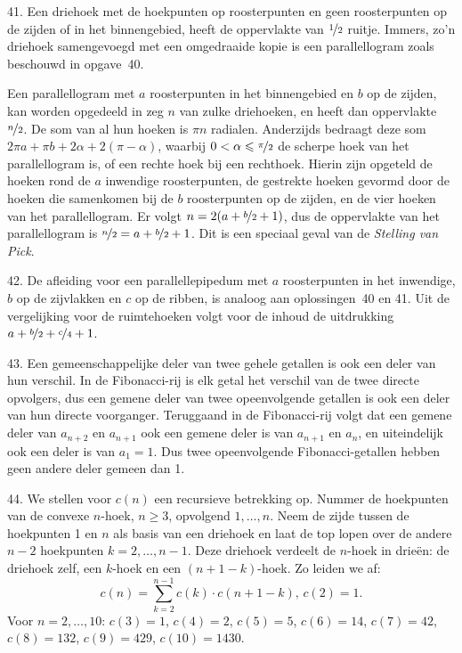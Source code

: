 \begin{problem}{41.}
    Een driehoek met de hoekpunten op roosterpunten en geen roos\-terpunten op de zijden of in het binnengebied, heeft de oppervlakte van $\nicefrac{1}{2}$ ruitje. Immers, zo'n driehoek samengevoegd met een omge\-draaide kopie is een parallellogram zoals beschouwd in opgave~40.

    Een parallellogram met $a$ roosterpunten in het binnengebied en $b$ op de zijden, kan worden opgedeeld in zeg $n$ van zulke driehoeken, en heeft dan oppervlakte $\nicefrac{n}{2}$. De som van al hun hoeken is $\pi n$ radialen. Anderzijds bedraagt deze som $2 \pi a + \pi b + 2 \alpha + 2 (\pi - \alpha)$, waarbij $0 < \alpha \leq \nicefrac{\pi}{2}$ de scherpe hoek van het parallellogram is, of een rechte hoek bij een rechthoek. Hierin zijn opgeteld de hoeken rond de $a$ inwendige roosterpunten, de gestrekte hoeken gevormd door de hoeken die samenkomen bij de $b$ roosterpunten op de zijden, en de vier hoeken van het parallellogram. Er volgt $n = 2 (a + \nicefrac{b}{2} + 1)$, dus de oppervlakte van het parallellogram is $\nicefrac{n}{2} = a + \nicefrac{b}{2} + 1$. Dit is een speciaal geval van de \textit{Stelling van Pick}.
\end{problem}

\begin{problem}{42.}
	De afleiding voor een parallellepipedum met $a$ roosterpunten in het inwendige, $b$ op de zijvlakken en $c$ op de ribben, is analoog aan oplossingen~40 en 41. Uit de vergelijking voor de ruimtehoeken volgt voor de inhoud de uitdrukking $a + \nicefrac{b}{2} + \nicefrac{c}{4} + 1$.
\end{problem}

\clearpage

\begin{problem}{43.}
    Een gemeenschappelijke deler van twee gehele getallen is ook een deler van hun verschil. In de Fibonacci-rij is elk getal het verschil van de twee directe opvolgers, dus een gemene deler van twee opeenvolgen\-de getallen is ook een deler van hun directe voorganger. Teruggaand in de Fibonacci-rij volgt dat een gemene deler van $a_{n+2}$ en $a_{n+1}$ ook een gemene deler is van $a_{n+1}$ en $a_{n}$, en uiteindelijk ook een deler is van $a_1 = 1$. Dus twee opeenvolgende Fibonacci-getallen hebben geen andere deler gemeen dan 1.
\end{problem}

\begin{problem}{44.}
	We stellen voor $c(n)$ een recursieve betrekking op. Nummer de hoekpunten van de convexe $n$-hoek, $n \geq 3$, opvolgend $1,\dotsc,n$. Neem de zijde tussen de hoekpunten 1 en $n$ als basis van een driehoek en laat de top lopen over de andere $n - 2$ hoekpunten $k = 2,\dotsc,n-1$. Deze driehoek verdeelt de $n$-hoek in drieën: de driehoek zelf, een $k$-hoek en een $(n + 1 - k)$-hoek. Zo leiden we af:
    \begin{equation*}
        c(n) = \textstyle\sum\limits_{k=2}^{n-1} c(k) \cdot c(n + 1 - k),\, c(2) = 1.
    \end{equation*}
    Voor $n = 2,\dotsc,10$: $c(3) = 1$, $c(4) = 2$, $c(5) = 5$, $c(6) = 14$, $c(7) = 42$, $c(8) = 132$, $c(9) = 429$, $c(10) = 1430$.
\end{problem}

